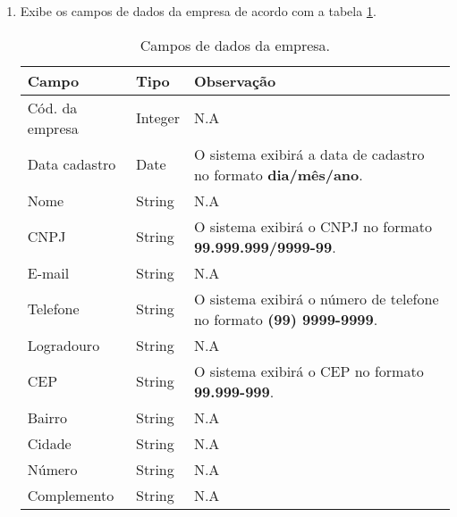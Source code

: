 \begin{enumerate}[label=ED\arabic*]
	\item Exibe os campos de dados da empresa de acordo com a tabela \ref{uc014_tb_rn1}. \label{uc014_rn:1}
	\begin{table}[htb]
		\ABNTEXfontereduzida
		\caption[Campos de dados da empresa]{Campos de dados da empresa.}
		\label{uc014_tb_rn1}
		\begin{tabular}{|p{4.0cm}|p{3.0cm}|p{7.25cm}|}
			\hline
			\textbf{Campo}  & \textbf{Tipo} & \textbf{Observação}                                                        \\ \hline
			Cód. da empresa & Integer       & N.A                                                                        \\ \hline
			Data cadastro   & Date          & O sistema exibirá a data de cadastro no formato \textbf{dia/mês/ano}.      \\ \hline
			Nome            & String        & N.A                                                                        \\ \hline
			CNPJ            & String        & O sistema exibirá o CNPJ no formato \textbf{99.999.999/9999-99}.           \\ \hline
			E-mail          & String        & N.A                                                                        \\ \hline
			Telefone        & String        & O sistema exibirá o número de telefone no formato \textbf{(99) 9999-9999}. \\ \hline
			Logradouro      & String        & N.A                                                                        \\ \hline
			CEP             & String        & O sistema exibirá o CEP no formato \textbf{99.999-999}.                    \\ \hline
			Bairro          & String        & N.A                                                                        \\ \hline
			Cidade          & String        & N.A                                                                        \\ \hline
			Número          & String        & N.A                                                                        \\ \hline
			Complemento     & String        & N.A                                                                        \\ \hline
		\end{tabular}
	\end{table}
\end{enumerate}